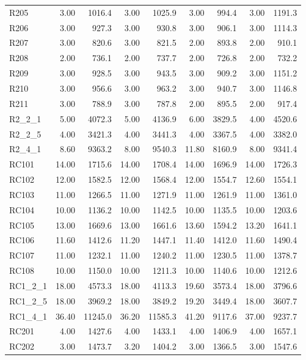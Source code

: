 \documentclass{article}
\begin{document}
{\begin{longtable}{l r r r r r r r r }
R205 & 3.00 & 1016.4 & 3.00 & 1025.9 & 3.00 & 994.4 & 3.00 & 1191.3 \\
R206 & 3.00 & 927.3 & 3.00 & 930.8 & 3.00 & 906.1 & 3.00 & 1114.3 \\
R207 & 3.00 & 820.6 & 3.00 & 821.5 & 2.00 & 893.8 & 2.00 & 910.1 \\
R208 & 2.00 & 736.1 & 2.00 & 737.7 & 2.00 & 726.8 & 2.00 & 732.2 \\
R209 & 3.00 & 928.5 & 3.00 & 943.5 & 3.00 & 909.2 & 3.00 & 1151.2 \\
R210 & 3.00 & 956.6 & 3.00 & 963.2 & 3.00 & 940.7 & 3.00 & 1146.8 \\
R211 & 3.00 & 788.9 & 3.00 & 787.8 & 2.00 & 895.5 & 2.00 & 917.4 \\
R2\_2\_1 & 5.00 & 4072.3 & 5.00 & 4136.9 & 6.00 & 3829.5 & 4.00 & 4520.6 \\
R2\_2\_5 & 4.00 & 3421.3 & 4.00 & 3441.3 & 4.00 & 3367.5 & 4.00 & 3382.0 \\
R2\_4\_1 & 8.60 & 9363.2 & 8.00 & 9540.3 & 11.80 & 8160.9 & 8.00 & 9341.4 \\
RC101 & 14.00 & 1715.6 & 14.00 & 1708.4 & 14.00 & 1696.9 & 14.00 & 1726.3 \\
RC102 & 12.00 & 1582.5 & 12.00 & 1568.4 & 12.00 & 1554.7 & 12.60 & 1554.1 \\
RC103 & 11.00 & 1266.5 & 11.00 & 1271.9 & 11.00 & 1261.9 & 11.00 & 1361.0 \\
RC104 & 10.00 & 1136.2 & 10.00 & 1142.5 & 10.00 & 1135.5 & 10.00 & 1203.6 \\
RC105 & 13.00 & 1669.6 & 13.00 & 1661.6 & 13.60 & 1594.2 & 13.20 & 1641.1 \\
RC106 & 11.60 & 1412.6 & 11.20 & 1447.1 & 11.40 & 1412.0 & 11.60 & 1490.4 \\
RC107 & 11.00 & 1232.1 & 11.00 & 1240.2 & 11.00 & 1230.5 & 11.00 & 1378.7 \\
RC108 & 10.00 & 1150.0 & 10.00 & 1211.3 & 10.00 & 1140.6 & 10.00 & 1212.6 \\
RC1\_2\_1 & 18.00 & 4573.3 & 18.00 & 4113.3 & 19.60 & 3573.4 & 18.00 & 3796.6 \\
RC1\_2\_5 & 18.00 & 3969.2 & 18.00 & 3849.2 & 19.20 & 3449.4 & 18.00 & 3607.7 \\
RC1\_4\_1 & 36.40 & 11245.0 & 36.20 & 11585.3 & 41.20 & 9117.6 & 37.00 & 9237.7 \\
RC201 & 4.00 & 1427.6 & 4.00 & 1433.1 & 4.00 & 1406.9 & 4.00 & 1657.1 \\
RC202 & 3.00 & 1473.7 & 3.20 & 1404.2 & 3.00 & 1366.5 & 3.00 & 1547.6 \\

\end{longtable}}
\end{document}
